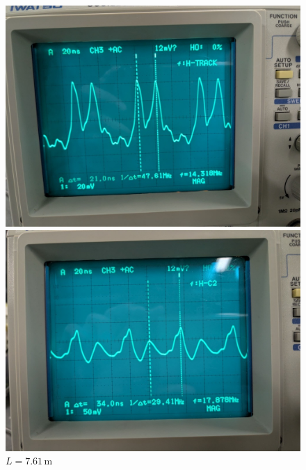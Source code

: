 \documentclass{jarticle}
\begin{document}
\begin{figure}[H]
  \centering
  \begin{minipage}[b]{0.49\columnwidth}
    \centering
    \includegraphics[scale=0.15]{cable1_result_picture.jpg}
    \caption{$L=2.04\,\mathrm{m}$}
  \end{minipage}
  \begin{minipage}[b]{0.49\columnwidth}
    \centering
    \includegraphics[scale=0.15]{cable2_result_picture.jpg}
    \caption{$L=7.61\,\mathrm{m}$}
  \end{minipage}
\end{figure}
\end{document}
